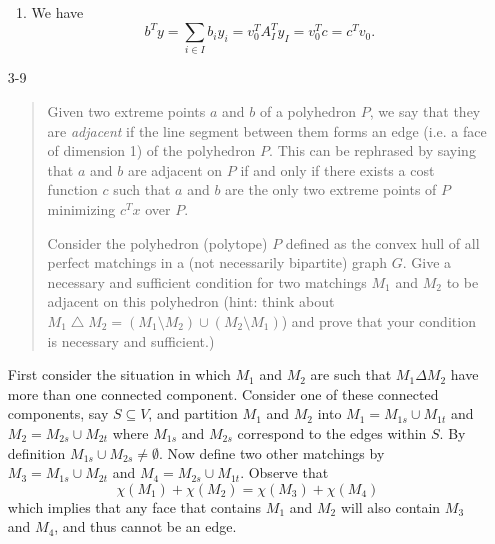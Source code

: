 \documentclass[12pt]{article}
\begin{document}
\begin{enumerate}
\begin{enumerate}
\item We have
\[
b^T y = \sum_{i\in I} b_i y_i = v_0^T A_I^T y_I = v_0^T c = c^T v_0.
\]
\end{enumerate}


\iffalse
\item[3-9]
\begin{quote}
Given two extreme points $a$ and $b$ of a polyhedron $P$, we say that they are
{\it adjacent} if the line segment between them forms an edge (i.e. a face
of dimension 1) of the polyhedron $P$. This can be rephrased by saying
that $a$ and $b$ are adjacent on $P$ if and only if there exists a
cost function $c$ such that $a$ and $b$ are the only two extreme
points of $P$ minimizing $c^Tx$ over $P$.

Consider the polyhedron (polytope) $P$ defined as the convex hull of
all perfect matchings in a (not necessarily bipartite) graph $G$. Give
a necessary and sufficient condition for two matchings $M_1$ and $M_2$
to be adjacent on this polyhedron (hint: think about $M_1
\bigtriangleup M_2=(M_1\setminus M_2) \cup (M_2\setminus M_1)$) and
prove that your condition is necessary and sufficient.)
\end{quote}

First consider the situation in which $M_1$ and $M_2$ are such that
$M_1\Delta M_2$ have more than one connected component. Consider one
of these connected components, say $S\subseteq V$, and partition $M_1$
and $M_2$ into $M_1=M_{1s}\cup M_{1t}$ and $M_2=M_{2s}\cup M_{2t}$
where $M_{1s}$ and $M_{2s}$ correspond to the edges within $S$. By
definition $M_{1s}\cup M_{2s}\neq \emptyset$. Now define two other
matchings by $M_3=M_{1s}\cup M_{2t}$ and $M_4=M_{2s}\cup
M_{1t}$. Observe that
$$\chi(M_1) + \chi(M_2) = \chi(M_3)+\chi(M_4)$$
which implies that any face that contains $M_1$ and $M_2$ will also
contain $M_3$ and $M_4$, and thus cannot be an edge.



\end{enumerate}
\end{document}
